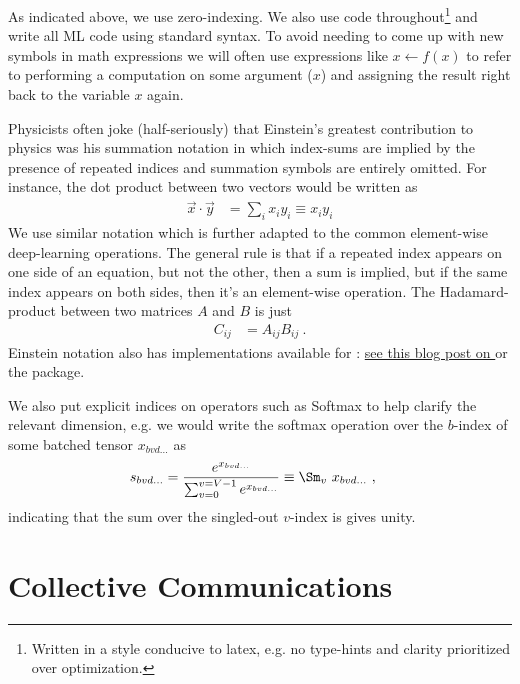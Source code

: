 \documentclass[11pt]{article}
\begin{document}
As indicated above,  we use zero-indexing. We also use  code
throughout\footnote{Written in a style conducive to latex, e.g. no type-hints and clarity
	prioritized over optimization.}  and
write all ML code using standard  syntax. To avoid needing to come up with new
symbols in math expressions we will often use expressions like $ x \leftarrow f(x) $ to refer to performing
a computation on some argument ($ x $) and assigning the result right back to the variable $ x $
again.

Physicists often joke (half-seriously) that Einstein's greatest contribution to physics was his
summation notation in which index-sums are implied by the presence of repeated indices and summation
symbols are entirely omitted. For instance, the dot product between two vectors would be written as
\begin{align}
	\vec{x} \cdot \vec{y} & = \sum _{ i } x _{ i } y _{ i } \equiv x _{ i } y _{  i }
	\label{app_eq_einstein_sum}
\end{align}
We use similar notation which is further adapted to the common element-wise deep-learning
operations.  The general rule is that if a repeated index appears on one side of an equation, but
not the other, then a sum is implied, but if the same index appears on both sides, then it's an
element-wise operation. The Hadamard-product between two matrices $ A $ and $ B $ is just
\begin{align}
	C _{ ij } & = A _{ ij } B _{ ij }\ .
\end{align}
Einstein notation also has implementations available for :
\href{https://rockt.github.io/2018/04/30/einsum}{see this blog post on } or the
\href{https://einops.rocks/1-einops-basics/}{} package.

We also put explicit indices on operators such as Softmax to help clarify the relevant
dimension, e.g. we would write the softmax operation over the $ b $-index of some batched
tensor $ x _{ bvd\ldots } $ as
\begin{align}
	s _{ bvd\ldots } & = \frac{ e^{ x _{ bv d\ldots}  } }{ \sum _{ v = 0 } ^{  v= V-1 } e^{ x _{
						bvd\ldots } } } \equiv
	\Sm _{ v } \ x _{ bvd\ldots }
	\ , \label{app_eq_einstein_softmax}
\end{align}
indicating that the sum over the singled-out $ v $-index is gives unity.

\section{Collective Communications \label{app_collective_communications} }
\end{document}
